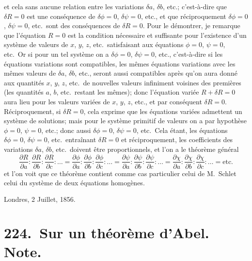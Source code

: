\documentclass[11pt,a4paper]{book}
\theoremstyle{plain}
\begin{document}
et cela sans aucune relation entre les variations $\delta a$, $\delta b$, etc.; c'est-\`{a}-dire que $\delta R=0$ est une cons\'{e}quence de $\delta\phi=0$, $\delta\psi=0$, etc., et que r\'{e}ciproquement $\delta\phi=0$, $\delta\psi=0$, etc.\ sont des cons\'{e}quences de $\delta R=0$. Pour le d\'{e}montrer, je remarque que l'\'{e}quation $R=0$ est la condition n\'{e}cessaire et suffisante pour l'existence d'un syst\`{e}me de valeurs de $x$, $y$, $z$, etc.\ satisfaisant aux \'{e}quations $\phi=0$, $\psi=0$, etc.\ Or si pour un tel syst\`{e}me on a $\delta\phi=0$, $\delta\psi=0$, etc., c'est-\`{a}-dire si les \'{e}quations variations sont compatibles, les m\^{e}mes \'{e}quations variations avec les m\^{e}mes valeurs de $\delta a$, $\delta b$, etc., seront aussi compatibles apr\`{e}s qu'on aura donn\'{e} aux quantit\'{e}s $x$, $y$, $z$, etc.\ de nouvelles valeurs infiniment voisines des premi\`{e}res (les quantit\'{e}s $a$, $b$, etc.\ restant les m\^{e}mes); donc l'\'{e}quation vari\'{e}e $R+\delta R=0$ aura lieu pour les valeurs vari\'{e}es de $x$, $y$, $z$, etc., et par cons\'{e}quent $\delta R=0$. R\'{e}ciproquement, si $\delta R=0$, cela exprime que les \'{e}quations vari\'{e}es admettent un syst\`{e}me de solutions; mais pour le syst\`{e}me primitif de valeurs on a par hypoth\`{e}se $\phi=0$, $\psi=0$, etc.; donc aussi $\delta\phi=0$, $\delta\psi=0$, etc.\ Cela \'{e}tant, les \'{e}quations $\delta\phi=0$, $\delta\psi=0$, etc.\ entra\^{i}nant $\delta R=0$ et r\'{e}ciproquement, les coefficients des variations $\delta a$, $\delta b$, etc.\ doivent \^{e}tre proportionnels, et l'on a le th\'{e}or\`{e}me g\'{e}n\'{e}ral
\begin{equation}
\frac{\partial R}{\partial a}:\frac{\partial R}{\partial b}:\frac{\partial R}{\partial c}:\ldots
=\frac{\partial\phi}{\partial a}:\frac{\partial\phi}{\partial b}:\frac{\partial\phi}{\partial c}:\ldots
=\frac{\partial\psi}{\partial a}:\frac{\partial\psi}{\partial b}:\frac{\partial\psi}{\partial c}:\ldots
=\frac{\partial\chi}{\partial a}:\frac{\partial\chi}{\partial b}:\frac{\partial\chi}{\partial c}:\ldots
=\text{etc.}
\end{equation}
et l'on voit que ce th\'{e}or\`{e}me contient comme cas particulier celui de M.~Schl\afli et celui du syst\`{e}me de deux \'{e}quations homog\`{e}nes.

Londres, 2 Juillet, 1856.
\newpage

\chapter[Sur un th\'{e}or\`{e}me d'Abel]{224.\ Sur un th\'{e}or\`{e}me d'Abel. Note.}
\label{paper224}
\end{document}
